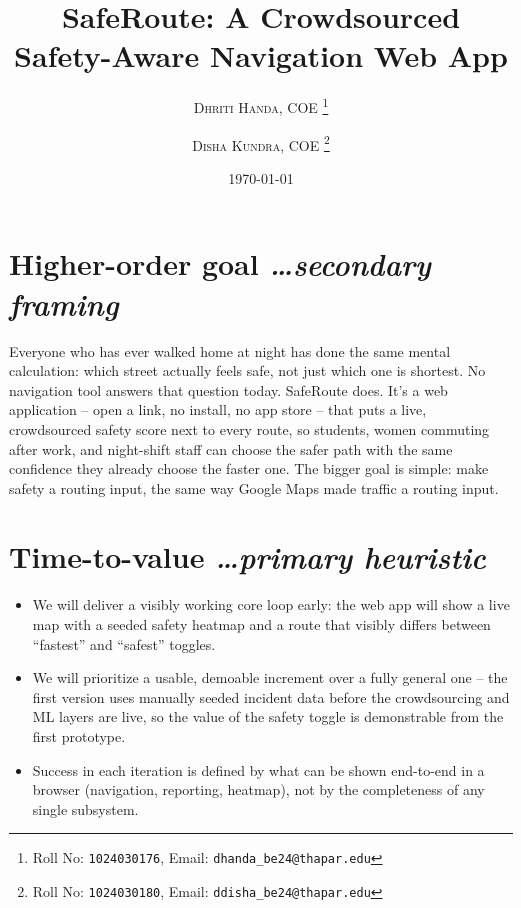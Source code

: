 \documentclass[11pt,a4paper]{article}
\title{SafeRoute: A Crowdsourced Safety-Aware Navigation Web App}
\author{
  \textsc{Dhriti Handa}, COE%
  \thanks{Roll No: \texttt{1024030176}, %
    Email: \texttt{dhanda\_be24@thapar.edu}}
  \and
  \textsc{Disha Kundra}, COE%
  \thanks{Roll No: \texttt{1024030180}, %
    Email: \texttt{ddisha\_be24@thapar.edu}}
}
\date{\today}
\newcommand{\BvrHint}[1]{%
  {\normalfont\normalsize\itshape\hfill #1}}
\begin{document}
\maketitle

\section{Higher-order goal%
  \BvrHint{\ldots secondary framing}}
Everyone who has ever walked home at night has done the same
mental calculation: which street actually feels safe, not just
which one is shortest. No navigation tool answers that question
today. SafeRoute does. It's a web application -- open a link, no
install, no app store -- that puts a live, crowdsourced safety
score next to every route, so students, women commuting after
work, and night-shift staff can choose the safer path with the
same confidence they already choose the faster one. The bigger
goal is simple: make safety a routing input, the same way Google
Maps made traffic a routing input.

\section{Time-to-value %
\BvrHint{\ldots primary heuristic}}
\begin{itemize}[leftmargin=0.7cm]
    \item We will deliver a visibly working core loop early: the
    web app will show a live map with a seeded safety heatmap and
    a route that visibly differs between ``fastest'' and
    ``safest'' toggles.
    \item We will prioritize a usable, demoable increment over a
    fully general one -- the first version uses manually seeded
    incident data before the crowdsourcing and ML layers are
    live, so the value of the safety toggle is demonstrable from
    the first prototype.
    \item Success in each iteration is defined by what can be
    shown end-to-end in a browser (navigation, reporting,
    heatmap), not by the completeness of any single subsystem.
\end{itemize}
\end{document}
